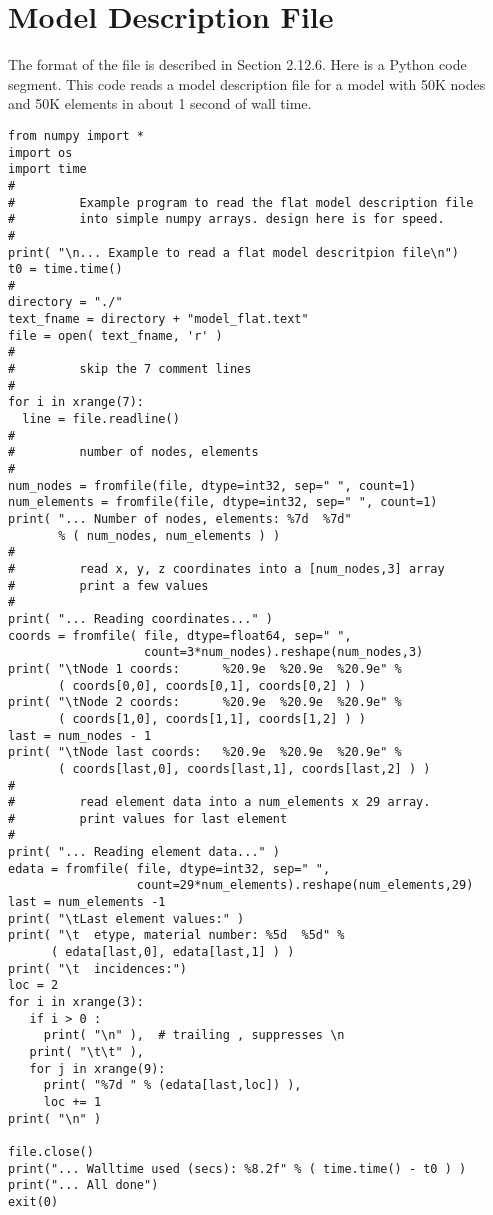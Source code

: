 \documentclass[10pt]{report}
\numberwithin{equation}{section}
\begin{document}
\section{Model Description File }

The format of the file is described in Section 2.12.6.
Here is a Python code segment.  This code reads a model 
description file for a model with 50K nodes and 50K
elements in about 1 second of wall time.
\small
\begin{verbatim}
from numpy import *
import os
import time
#
#         Example program to read the flat model description file 
#         into simple numpy arrays. design here is for speed.
#
print( "\n... Example to read a flat model descritpion file\n")
t0 = time.time()
#
directory = "./"
text_fname = directory + "model_flat.text"
file = open( text_fname, 'r' )
#
#         skip the 7 comment lines 
#
for i in xrange(7):
  line = file.readline()
#
#         number of nodes, elements
#
num_nodes = fromfile(file, dtype=int32, sep=" ", count=1)
num_elements = fromfile(file, dtype=int32, sep=" ", count=1)
print( "... Number of nodes, elements: %7d  %7d" 
       % ( num_nodes, num_elements ) )
#
#         read x, y, z coordinates into a [num_nodes,3] array
#         print a few values
#
print( "... Reading coordinates..." )
coords = fromfile( file, dtype=float64, sep=" ", 
                   count=3*num_nodes).reshape(num_nodes,3)
print( "\tNode 1 coords:      %20.9e  %20.9e  %20.9e" % 
       ( coords[0,0], coords[0,1], coords[0,2] ) )
print( "\tNode 2 coords:      %20.9e  %20.9e  %20.9e" % 
       ( coords[1,0], coords[1,1], coords[1,2] ) )
last = num_nodes - 1
print( "\tNode last coords:   %20.9e  %20.9e  %20.9e" % 
       ( coords[last,0], coords[last,1], coords[last,2] ) )
#
#         read element data into a num_elements x 29 array.
#         print values for last element
#
print( "... Reading element data..." )
edata = fromfile( file, dtype=int32, sep=" ", 
                  count=29*num_elements).reshape(num_elements,29)
last = num_elements -1
print( "\tLast element values:" )
print( "\t  etype, material number: %5d  %5d" % 
      ( edata[last,0], edata[last,1] ) )
print( "\t  incidences:")
loc = 2
for i in xrange(3):
   if i > 0 :
     print( "\n" ),  # trailing , suppresses \n
   print( "\t\t" ),
   for j in xrange(9):
     print( "%7d " % (edata[last,loc]) ),
     loc += 1
print( "\n" )
     
file.close()
print("... Walltime used (secs): %8.2f" % ( time.time() - t0 ) )
print("... All done")
exit(0)
\end{verbatim}
\normalsize
\end{document}
